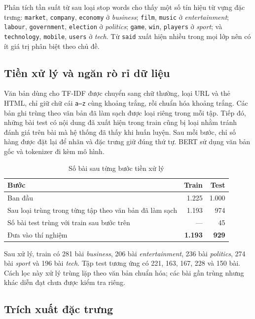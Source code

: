 \documentclass[conference,a4paper]{IEEEtran}
\begin{document}
Phân tích tần suất từ sau loại stop words cho thấy một số tín hiệu từ vựng đặc trưng: \texttt{market}, \texttt{company}, \texttt{economy} ở \textit{business}; \texttt{film}, \texttt{music} ở \textit{entertainment}; \texttt{labour}, \texttt{government}, \texttt{election} ở \textit{politics}; \texttt{game}, \texttt{win}, \texttt{players} ở \textit{sport}; và \texttt{technology}, \texttt{mobile}, \texttt{users} ở \textit{tech}. Từ \texttt{said} xuất hiện nhiều trong mọi lớp nên có ít giá trị phân biệt theo chủ đề.

\subsection{Tiền xử lý và ngăn rò rỉ dữ liệu}

Văn bản dùng cho TF-IDF được chuyển sang chữ thường, loại URL và thẻ HTML, chỉ giữ chữ cái \texttt{a--z} cùng khoảng trắng, rồi chuẩn hóa khoảng trắng. Các bản ghi trùng theo văn bản đã làm sạch được loại riêng trong mỗi tập. Tiếp đó, những bài test có nội dung đã xuất hiện trong train cũng bị loại nhằm tránh đánh giá trên bài mà hệ thống đã thấy khi huấn luyện. Sau mỗi bước, chỉ số hàng được đặt lại để nhãn và đặc trưng giữ đúng thứ tự. BERT sử dụng văn bản gốc và tokenizer đi kèm mô hình.

\begin{table}[!t]
\centering
\caption{Số bài sau từng bước tiền xử lý}
\label{tab:preprocessing}
\begin{tabular}{lrr}
\toprule
\textbf{Bước} & \textbf{Train} & \textbf{Test} \\
\midrule
Ban đầu & 1.225 & 1.000 \\
Sau loại trùng trong từng tập theo văn bản đã làm sạch & 1.193 & 974 \\
Số bài test trùng với train sau bước trên & --- & 45 \\
Đưa vào thí nghiệm & \textbf{1.193} & \textbf{929} \\
\bottomrule
\end{tabular}
\end{table}

Sau xử lý, train có 281 bài \textit{business}, 206 bài \textit{entertainment}, 236 bài \textit{politics}, 274 bài \textit{sport} và 196 bài \textit{tech}. Tập test tương ứng có 221, 163, 167, 228 và 150 bài. Cách lọc này xử lý trùng lặp theo văn bản chuẩn hóa; các bài gần trùng nhưng khác diễn đạt chưa được kiểm tra riêng.

\subsection{Trích xuất đặc trưng}
\end{document}

